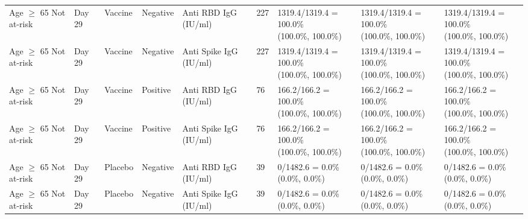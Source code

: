 \documentclass[]{book}
\theoremstyle{definition}
\theoremstyle{definition}
\theoremstyle{definition}
\newcommand{\1}{\mathbbm{1}}
\begin{document}
\begin{landscape}
\begin{ThreePartTable}
\begin{longtable}[t]{>{\raggedright\arraybackslash}p{2.7cm}llllllll}
\hspace{1em}Age $\geq$ 65 Not at-risk & Day 29 & Vaccine & Negative & Anti RBD IgG (IU/ml) & 227 & \makecell[l]{1319.4/1319.4 = 100.0\%\\(100.0\%, 100.0\%)} & \makecell[l]{1319.4/1319.4 = 100.0\%\\(100.0\%, 100.0\%)} & \makecell[l]{1319.4/1319.4 = 100.0\%\\(100.0\%, 100.0\%)}\\
\hspace{1em}Age $\geq$ 65 Not at-risk & Day 29 & Vaccine & Negative & Anti Spike IgG (IU/ml) & 227 & \makecell[l]{1319.4/1319.4 = 100.0\%\\(100.0\%, 100.0\%)} & \makecell[l]{1319.4/1319.4 = 100.0\%\\(100.0\%, 100.0\%)} & \makecell[l]{1319.4/1319.4 = 100.0\%\\(100.0\%, 100.0\%)}\\
\hspace{1em}Age $\geq$ 65 Not at-risk & Day 29 & Vaccine & Positive & Anti RBD IgG (IU/ml) & 76 & \makecell[l]{166.2/166.2 = 100.0\%\\(100.0\%, 100.0\%)} & \makecell[l]{166.2/166.2 = 100.0\%\\(100.0\%, 100.0\%)} & \makecell[l]{166.2/166.2 = 100.0\%\\(100.0\%, 100.0\%)}\\
\hspace{1em}Age $\geq$ 65 Not at-risk & Day 29 & Vaccine & Positive & Anti Spike IgG (IU/ml) & 76 & \makecell[l]{166.2/166.2 = 100.0\%\\(100.0\%, 100.0\%)} & \makecell[l]{166.2/166.2 = 100.0\%\\(100.0\%, 100.0\%)} & \makecell[l]{166.2/166.2 = 100.0\%\\(100.0\%, 100.0\%)}\\
\hspace{1em}Age $\geq$ 65 Not at-risk & Day 29 & Placebo & Negative & Anti RBD IgG (IU/ml) & 39 & \makecell[l]{0/1482.6 = 0.0\%\\(0.0\%, 0.0\%)} & \makecell[l]{0/1482.6 = 0.0\%\\(0.0\%, 0.0\%)} & \makecell[l]{0/1482.6 = 0.0\%\\(0.0\%, 0.0\%)}\\
\hspace{1em}Age $\geq$ 65 Not at-risk & Day 29 & Placebo & Negative & Anti Spike IgG (IU/ml) & 39 & \makecell[l]{0/1482.6 = 0.0\%\\(0.0\%, 0.0\%)} & \makecell[l]{0/1482.6 = 0.0\%\\(0.0\%, 0.0\%)} & \makecell[l]{0/1482.6 = 0.0\%\\(0.0\%, 0.0\%)}\\

\end{longtable}
\end{ThreePartTable}
\end{landscape}
\end{document}
